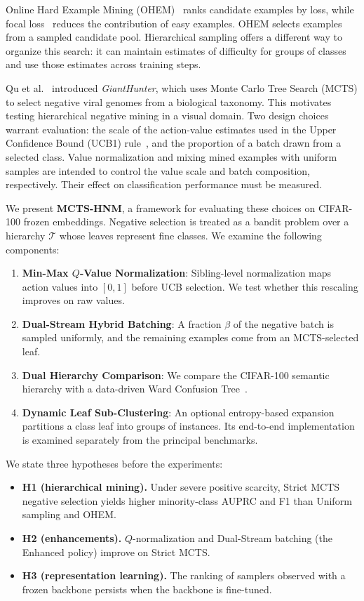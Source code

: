 \documentclass[11pt]{article}
\begin{document}
Online Hard Example Mining (OHEM)~\cite{shrivastava2016training} ranks candidate examples by loss, while focal loss~\cite{lin2017focal} reduces the contribution of easy examples. OHEM selects examples from a sampled candidate pool. Hierarchical sampling offers a different way to organize this search: it can maintain estimates of difficulty for groups of classes and use those estimates across training steps.

Qu et al.~\cite{qu2025gianthunter} introduced \textit{GiantHunter}, which uses Monte Carlo Tree Search (MCTS) to select negative viral genomes from a biological taxonomy. This motivates testing hierarchical negative mining in a visual domain. Two design choices warrant evaluation: the scale of the action-value estimates used in the Upper Confidence Bound (UCB1) rule~\cite{auer2002finite}, and the proportion of a batch drawn from a selected class. Value normalization and mixing mined examples with uniform samples are intended to control the value scale and batch composition, respectively. Their effect on classification performance must be measured.

We present \textbf{MCTS-HNM}, a framework for evaluating these choices on CIFAR-100 frozen embeddings. Negative selection is treated as a bandit problem over a hierarchy $\mathcal{T}$ whose leaves represent fine classes. We examine the following components:
\begin{enumerate}
    \item \textbf{Min-Max $Q$-Value Normalization}: Sibling-level normalization maps action values into $[0, 1]$ before UCB selection. We test whether this rescaling improves on raw values.
    \item \textbf{Dual-Stream Hybrid Batching}: A fraction $\beta$ of the negative batch is sampled uniformly, and the remaining examples come from an MCTS-selected leaf.
    \item \textbf{Dual Hierarchy Comparison}: We compare the CIFAR-100 semantic hierarchy with a data-driven Ward Confusion Tree~\cite{ward1963hierarchical}.
    \item \textbf{Dynamic Leaf Sub-Clustering}: An optional entropy-based expansion partitions a class leaf into groups of instances. Its end-to-end implementation is examined separately from the principal benchmarks.
\end{enumerate}

We state three hypotheses before the experiments:
\begin{itemize}
    \item \textbf{H1 (hierarchical mining).} Under severe positive scarcity, Strict MCTS negative selection yields higher minority-class AUPRC and F1 than Uniform sampling and OHEM.
    \item \textbf{H2 (enhancements).} $Q$-normalization and Dual-Stream batching (the Enhanced policy) improve on Strict MCTS.
    \item \textbf{H3 (representation learning).} The ranking of samplers observed with a frozen backbone persists when the backbone is fine-tuned.
\end{itemize}
\end{document}
